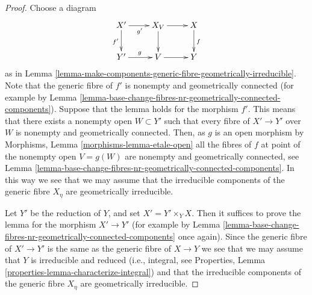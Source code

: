 \begin{proof}
Choose a diagram
$$
\xymatrix{
X' \ar[d]_{f'} \ar[r]_{g'} & X_V \ar[r] \ar[d] & X \ar[d]^f \\
Y' \ar[r]^g & V \ar[r] & Y
}
$$
as in
Lemma \ref{lemma-make-components-generic-fibre-geometrically-irreducible}.
Note that the generic fibre of $f'$ is nonempty and geometrically connected
(for example by
Lemma \ref{lemma-base-change-fibres-nr-geometrically-connected-components}).
Suppose that the lemma holds for the morphism $f'$. This means that
there exists a nonempty open $W \subset Y'$ such that every fibre of
$X' \to Y'$ over $W$ is nonempty and geometrically connected.
Then, as $g$ is an open morphism by
Morphisms, Lemma \ref{morphisms-lemma-etale-open}
all the fibres of $f$ at point of the nonempty open $V = g(W)$ are
nonempty and geometrically connected, see
Lemma \ref{lemma-base-change-fibres-nr-geometrically-connected-components}.
In this way we see that we may assume that the irreducible
components of the generic fibre $X_\eta$ are geometrically irreducible.

\medskip\noindent
Let $Y'$ be the reduction of $Y$, and set $X' = Y' \times_Y X$.
Then it suffices to prove the lemma for the morphism $X' \to Y'$
(for example by
Lemma \ref{lemma-base-change-fibres-nr-geometrically-connected-components}
once again). Since the generic fibre of $X' \to Y'$ is the same as the
generic fibre of $X \to Y$ we see that we may assume that $Y$ is
irreducible and reduced (i.e., integral, see
Properties, Lemma \ref{properties-lemma-characterize-integral})
and that the irreducible
components of the generic fibre $X_\eta$ are geometrically irreducible.


\end{proof}

